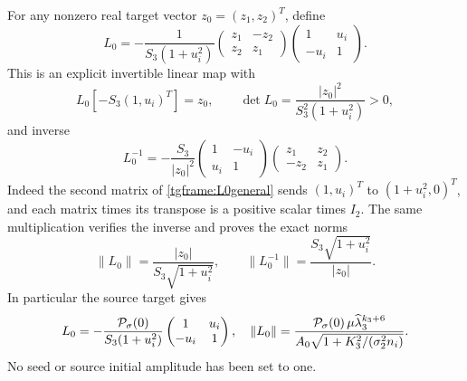 For any nonzero real target vector $z_0=(z_1,z_2)^T$, define
\begin{equation}\label{tgframe:L0general}
 L_0=-\frac1{S_3(1+u_i^2)}
 \begin{pmatrix}z_1&-z_2\\z_2&z_1\end{pmatrix}
 \begin{pmatrix}1&u_i\\-u_i&1\end{pmatrix}.
\end{equation}
This is an explicit invertible linear map with
\[
 L_0[-S_3(1,u_i)^T]=z_0,\qquad
 \det L_0=\frac{|z_0|^2}{S_3^2(1+u_i^2)}>0,
\]
and inverse
\begin{equation}\label{tgframe:L0inverse}
 L_0^{-1}=-\frac{S_3}{|z_0|^2}
       \begin{pmatrix}1&-u_i\\u_i&1\end{pmatrix}
       \begin{pmatrix}z_1&z_2\\-z_2&z_1\end{pmatrix}.
\end{equation}
Indeed the second matrix of \eqref{tgframe:L0general} sends
$(1,u_i)^T$ to $(1+u_i^2,0)^T$, and each matrix times its
transpose is a positive scalar times $I_2$.
The same multiplication verifies the inverse and proves the exact norms
\begin{equation}\label{tgframe:L0norms}
 \|L_0\|=\frac{|z_0|}{S_3\sqrt{1+u_i^2}},\qquad
 \|L_0^{-1}\|=\frac{S_3\sqrt{1+u_i^2}}{|z_0|}.
\end{equation}
In particular the source target gives
\[
 L_0=-\frac{{\cal P}_\sigma(0)}{S_3(1+u_i^2)}
        \begin{pmatrix}1&u_i\\-u_i&1\end{pmatrix},
 \quad
 \|L_0\|=
 \frac{{\cal P}_\sigma(0)\,\mu\widehat\lambda_3^{k_3+6}}
 {A_0\sqrt{1+K_3^2/(\sigma_2^2n_i)}}.
\]
No seed or source initial amplitude has been set to one.

